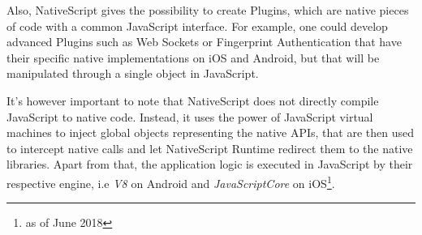 Also, NativeScript gives the possibility to create Plugins, which are native pieces of code with a common JavaScript interface. For example, one could develop advanced Plugins such as Web Sockets or Fingerprint Authentication that have their specific native implementations on iOS and Android, but that will be manipulated through a single object in JavaScript. 

It's however important to note that NativeScript does not directly compile JavaScript to native code. Instead, it uses the power of JavaScript virtual machines to inject global objects representing the native APIs, that are then used to intercept native calls and let NativeScript Runtime redirect them to the native libraries. Apart from that, the application logic is executed in JavaScript by their respective engine, i.e \textit{V8} on Android and \textit{JavaScriptCore} on iOS\footnote{as of June 2018}.


